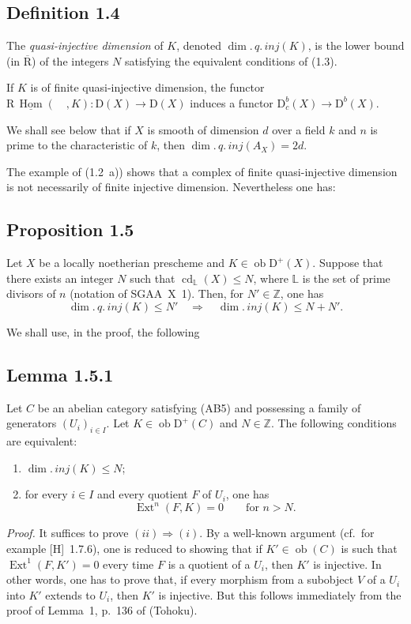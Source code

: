 \documentclass[11pt]{article}
\DeclareMathOperator{\Hom}{Hom}
\DeclareMathOperator{\Ext}{Ext}
\DeclareMathOperator{\cd}{cd}
\newcommand{\R}{\mathrm{R}}
\newcommand{\D}{\mathrm{D}}
\newcommand{\Z}{\mathbb{Z}}
\newcommand{\ob}{\operatorname{ob}}
\providecommand{\Hom}{\operatorname{Hom}}
\providecommand{\ob}{\operatorname{ob}}
\providecommand{\R}{\mathrm R}
\providecommand{\Z}{\mathbb Z}
\providecommand{\Hom}{\operatorname{Hom}}
\begin{document}
\subsection*{Definition 1.4}
The \emph{quasi-injective dimension} of $K$, denoted $\dim.\,q.\,inj(K)$, is the lower bound (in $\overline{\R}$) of the integers $N$ satisfying the equivalent conditions of (1.3).

If $K$ is of finite quasi-injective dimension, the functor $\R\,\underline{\Hom}(\quad,K) : \D(X) \to \D(X)$ induces a functor $\D_c^{b}(X) \to \D^{b}(X)$.

We shall see below that if $X$ is smooth of dimension $d$ over a field $k$ and $n$ is prime to the characteristic of $k$, then $\dim.\,q.\,inj(A_X) = 2d$.

The example of (1.2~a)) shows that a complex of finite quasi-injective dimension is not necessarily of finite injective dimension. Nevertheless one has:

\subsection*{Proposition 1.5}
Let $X$ be a locally noetherian prescheme and $K \in \ob \D^{+}(X)$. Suppose that there exists an integer $N$ such that $\cd_{\mathbb{L}}(X) \leqslant N$, where $\mathbb{L}$ is the set of prime divisors of $n$ (notation of SGAA~X~1). Then, for $N' \in \Z$, one has
\[
\dim.\,q.\,inj(K) \leqslant N' \quad \Longrightarrow \quad \dim.\,inj(K) \leqslant N + N'.
\]

We shall use, in the proof, the following

\subsection*{Lemma 1.5.1}
Let $C$ be an abelian category satisfying (AB5) and possessing a family of generators $(U_i)_{i \in I}$. Let $K \in \ob \D^{+}(C)$ and $N \in \Z$. The following conditions are equivalent:
\begin{enumerate}[label=(\roman*)]
\item $\dim.\,inj(K) \leqslant N$;
\item for every $i \in I$ and every quotient $F$ of $U_i$, one has
\[
\Ext^n(F,K) = 0 \qquad \text{for } n > N.
\]
\end{enumerate}

\emph{Proof.} It suffices to prove $(ii) \Rightarrow (i)$. By a well-known argument (cf.\ for example [H]~1.7.6), one is reduced to showing that if $K' \in \ob(C)$ is such that $\Ext^1(F,K') = 0$ every time $F$ is a quotient of a $U_i$, then $K'$ is injective. In other words, one has to prove that, if every morphism from a subobject $V$ of a $U_i$ into $K'$ extends to $U_i$, then $K'$ is injective. But this follows immediately from the proof of Lemma~1, p.~136 of (Tohoku).
\end{document}

